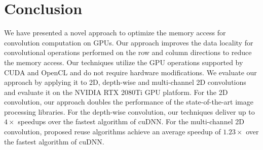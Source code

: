 \section{Conclusion}
We have presented a novel approach to optimize the memory access for convolution computation on GPUs. Our approach improves the data
locality for convolutional operations performed on the row and column directions to reduce the memory access. Our techniques utilize the
GPU operations supported by CUDA and OpenCL and do not require hardware modifications. We evaluate our approach by applying it to 2D, depth-wise and multi-channel 2D
convolutions and evaluate it on the NVIDIA RTX 2080Ti GPU platform. For the 2D convolution, our approach doubles the performance of the
state-of-the-art image processing libraries. For the depth-wise convolution, our techniques deliver up to $4 \times$ speedups over the fastest algorithm of cuDNN. For the multi-channel 2D convolution, proposed reuse algorithms achieve an average speedup of $1.23\times$ over the fastest algorithm of cuDNN.


